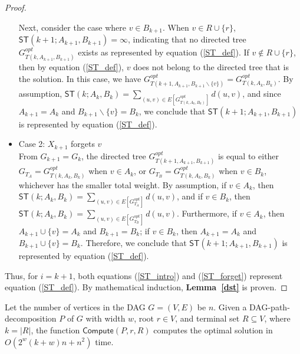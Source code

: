 \documentclass[runningheads]{llncs}
\theoremstyle{plain}
\theoremstyle{definition}
\begin{document}
\begin{proof}
\begin{itemize}
    Next, consider the case where $v \in B_{k+1}$. When $v \in R \cup \{r\}$, $\mathsf{ST}(k+1; A_{k+1}, B_{k+1}) = \infty$, indicating that no directed tree $G^{opt}_{T(k, A_{k+1}, B_{k+1})}$ exists as represented by equation (\ref{ST_def}). If $v \notin R \cup \{r\}$, then by equation (\ref{ST_def}), $v$ does not belong to the directed tree that is the solution. In this case, we have $G^{opt}_{T(k+1, A_{k+1}, B_{k+1} \backslash \{v\})} = G^{opt}_{T(k, A_k, B_k)}$. By assumption, $\mathsf{ST}(k; A_k, B_k) = \sum_{(u, v) \in E[G^{opt}_{T(k, A_k, B_k)}]} d(u, v)$, and since $A_{k+1} = A_k$ and $B_{k+1} \backslash \{v\} = B_k$, we conclude that $\mathsf{ST}(k+1; A_{k+1}, B_{k+1})$ is represented by equation (\ref{ST_def}).

    \item Case 2: $X_{k+1}$ forgets $v$\\
    From $G_{k+1} = G_k$, the directed tree $G^{opt}_{T(k+1, A_{k+1}, B_{k+1})}$ is equal to either $G_{T_A} = G^{opt}_{T(k, A_k, B_k)}$ when $v \in A_k$, or $G_{T_B} = G^{opt}_{T(k, A_k, B_k)}$ when $v \in B_k$, whichever has the smaller total weight. By assumption, if $v \in A_k$, then $\mathsf{ST}(k; A_k, B_k) = \sum_{(u, v) \in E[G^{opt}_{T_A}]} d(u, v)$, and if $v \in B_k$, then $\mathsf{ST}(k; A_k, B_k) = \sum_{(u, v) \in E[G^{opt}_{T_B}]} d(u, v)$. Furthermore, if $v \in A_k$, then $A_{k+1} \cup \{v\} = A_k$ and $B_{k+1} = B_k$; if $v \in B_k$, then $A_{k+1} = A_k$ and $B_{k+1} \cup \{v\} = B_k$. Therefore, we conclude that $\mathsf{ST}(k+1; A_{k+1}, B_{k+1})$ is represented by equation (\ref{ST_def}).
\end{itemize}
Thus, for $i = k+1$, both equations (\ref{ST_intro}) and (\ref{ST_forget}) represent equation (\ref{ST_def}). By mathematical induction, \textbf{Lemma~\ref{dst}} is proven.

\end{proof}


\begin{lemma}
    Let the number of vertices in the DAG $G = (V, E)$ be $n$. Given a DAG-path-decomposition $P$ of $G$ with width $w$, root $r \in V$, and terminal set $R \subseteq V$, where $k = |R|$, the function $\mathsf{Compute}(P, r, R)$ computes the optimal solution in $O(2^w(k+w)n + n^2)$ time.
\end{lemma}
\end{document}
